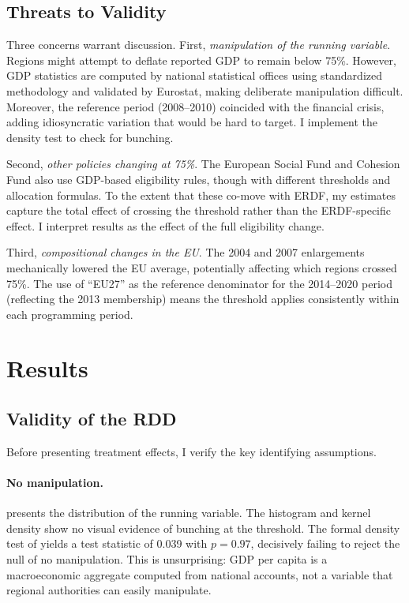 \documentclass[12pt]{article}
\begin{document}
\subsection{Threats to Validity}

Three concerns warrant discussion. First, \emph{manipulation of the running variable}. Regions might attempt to deflate reported GDP to remain below 75\%. However, GDP statistics are computed by national statistical offices using standardized methodology and validated by Eurostat, making deliberate manipulation difficult. Moreover, the reference period (2008--2010) coincided with the financial crisis, adding idiosyncratic variation that would be hard to target. I implement the \citet{CattaneoJanssonMa2020} density test to check for bunching.

Second, \emph{other policies changing at 75\%}. The European Social Fund and Cohesion Fund also use GDP-based eligibility rules, though with different thresholds and allocation formulas. To the extent that these co-move with ERDF, my estimates capture the total effect of crossing the threshold rather than the ERDF-specific effect. I interpret results as the effect of the full eligibility change.

Third, \emph{compositional changes in the EU}. The 2004 and 2007 enlargements mechanically lowered the EU average, potentially affecting which regions crossed 75\%. The use of ``EU27'' as the reference denominator for the 2014--2020 period (reflecting the 2013 membership) means the threshold applies consistently within each programming period.

\section{Results}
\label{sec:results}

\subsection{Validity of the RDD}

Before presenting treatment effects, I verify the key identifying assumptions.

\paragraph{No manipulation.}  presents the distribution of the running variable. The histogram and kernel density show no visual evidence of bunching at the threshold. The formal density test of \citet{CattaneoJanssonMa2020} yields a test statistic of 0.039 with $p = 0.97$, decisively failing to reject the null of no manipulation. This is unsurprising: GDP per capita is a macroeconomic aggregate computed from national accounts, not a variable that regional authorities can easily manipulate.
\end{document}
